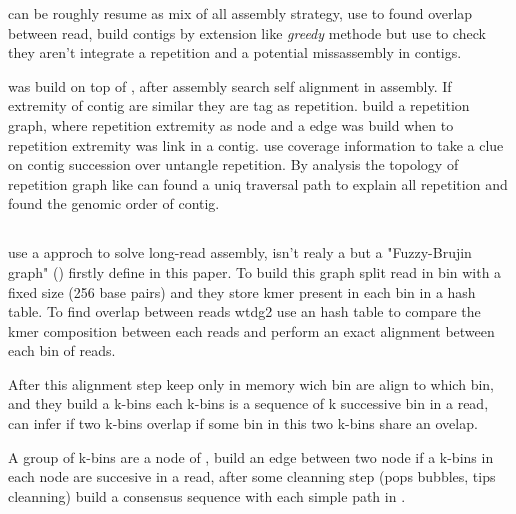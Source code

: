 \documentclass[main]{subfiles}
\begin{document}
\abruijn can be roughly resume as mix of all assembly strategy, use \DBG to found overlap between read, build contigs by extension like \textit{greedy} methode but use \OLC to check they aren't integrate a repetition and a potential missassembly in contigs.

\flye was build on top of \abruijn, after \abruijn assembly \flye search self alignment in assembly. If extremity of contig are similar they are tag as repetition. \flye build a repetition graph, where repetition extremity as node and a edge was build when to repetition extremity was link in a contig. \flye use coverage information to take a clue on contig succession over untangle repetition. By analysis the topology of repetition graph \flye like \hinge\cite{hinge} can found a uniq traversal path to explain all repetition and found the genomic order of contig.

 

\subsection{\wtdbg}

\wtdbg \cite{wtdbg2}  use a \DBG approch to solve long-read assembly, isn't realy a \DBG but a "Fuzzy-Brujin graph" () firstly define in this paper. To build this graph \wtdbg split read in bin with a fixed size (256 base pairs) and they store kmer present in each bin in a hash table.
To find overlap between reads wtdg2 use an hash table to compare the kmer composition between each reads and perform an exact alignment between each bin of reads. 

After this alignment step \wtdbg keep only in memory wich bin are align to which bin, and they build a k-bins each k-bins is a sequence of k successive bin in a read, \wtdbg can infer if two k-bins overlap if some bin in this two k-bins share an ovelap.

A group of k-bins are a node of , \wtdbg build an edge between two node if a k-bins in each node are succesive in a read, after some cleanning step (pops bubbles, tips cleanning) \wtdbg build a consensus sequence with each simple path in .
\end{document}
